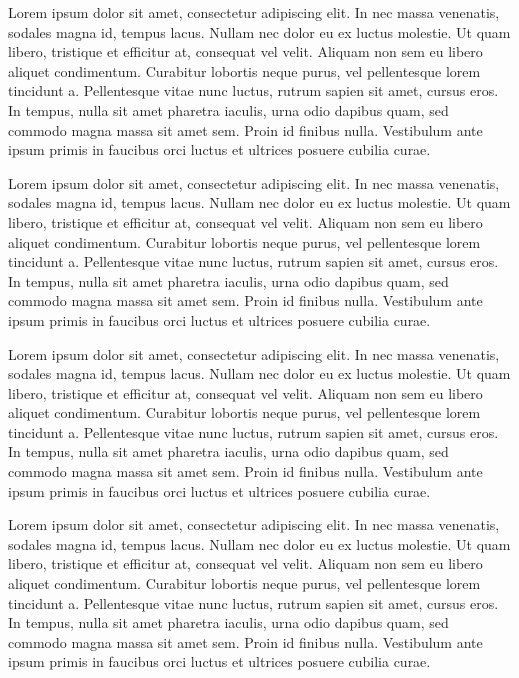 

Lorem ipsum dolor sit amet, consectetur adipiscing elit. In nec massa venenatis, sodales magna id, tempus lacus. Nullam nec dolor eu ex luctus molestie. Ut quam libero, tristique et efficitur at, consequat vel velit. Aliquam non sem eu libero aliquet condimentum. Curabitur lobortis neque purus, vel pellentesque lorem tincidunt a. Pellentesque vitae nunc luctus, rutrum sapien sit amet, cursus eros. In tempus, nulla sit amet pharetra iaculis, urna odio dapibus quam, sed commodo magna massa sit amet sem. Proin id finibus nulla. Vestibulum ante ipsum primis in faucibus orci luctus et ultrices posuere cubilia curae.


Lorem ipsum dolor sit amet, consectetur adipiscing elit. In nec massa venenatis, sodales magna id, tempus lacus. Nullam nec dolor eu ex luctus molestie. Ut quam libero, tristique et efficitur at, consequat vel velit. Aliquam non sem eu libero aliquet condimentum. Curabitur lobortis neque purus, vel pellentesque lorem tincidunt a. Pellentesque vitae nunc luctus, rutrum sapien sit amet, cursus eros. In tempus, nulla sit amet pharetra iaculis, urna odio dapibus quam, sed commodo magna massa sit amet sem. Proin id finibus nulla. Vestibulum ante ipsum primis in faucibus orci luctus et ultrices posuere cubilia curae.


Lorem ipsum dolor sit amet, consectetur adipiscing elit. In nec massa venenatis, sodales magna id, tempus lacus. Nullam nec dolor eu ex luctus molestie. Ut quam libero, tristique et efficitur at, consequat vel velit. Aliquam non sem eu libero aliquet condimentum. Curabitur lobortis neque purus, vel pellentesque lorem tincidunt a. Pellentesque vitae nunc luctus, rutrum sapien sit amet, cursus eros. In tempus, nulla sit amet pharetra iaculis, urna odio dapibus quam, sed commodo magna massa sit amet sem. Proin id finibus nulla. Vestibulum ante ipsum primis in faucibus orci luctus et ultrices posuere cubilia curae.


Lorem ipsum dolor sit amet, consectetur adipiscing elit. In nec massa venenatis, sodales magna id, tempus lacus. Nullam nec dolor eu ex luctus molestie. Ut quam libero, tristique et efficitur at, consequat vel velit. Aliquam non sem eu libero aliquet condimentum. Curabitur lobortis neque purus, vel pellentesque lorem tincidunt a. Pellentesque vitae nunc luctus, rutrum sapien sit amet, cursus eros. In tempus, nulla sit amet pharetra iaculis, urna odio dapibus quam, sed commodo magna massa sit amet sem. Proin id finibus nulla. Vestibulum ante ipsum primis in faucibus orci luctus et ultrices posuere cubilia curae.

